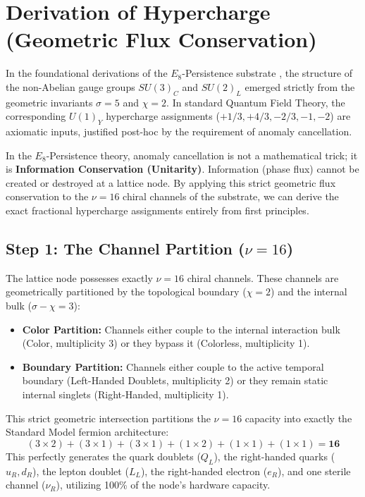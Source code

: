 \section{Derivation of Hypercharge (Geometric Flux Conservation)}
\label{app:OriginOfHypercharge}

In the foundational derivations of the $E_8$-Persistence substrate \cite{meyer_informational_2026}, the structure of the non-Abelian gauge groups $SU(3)_C$ and $SU(2)_L$ emerged strictly from the geometric invariants $\sigma=5$ and $\chi=2$. In standard Quantum Field Theory, the corresponding $U(1)_Y$ hypercharge assignments ($+1/3, +4/3, -2/3, -1, -2$) are axiomatic inputs, justified post-hoc by the requirement of anomaly cancellation.

In the $E_8$-Persistence theory, anomaly cancellation is not a mathematical trick; it is \textbf{Information Conservation (Unitarity)}. Information (phase flux) cannot be created or destroyed at a lattice node. By applying this strict geometric flux conservation to the $\nu=16$ chiral channels of the substrate, we can derive the exact fractional hypercharge assignments entirely from first principles.

\subsection{Step 1: The Channel Partition (\texorpdfstring{$\nu=16$}{nu=16})}
The lattice node possesses exactly $\nu=16$ chiral channels. These channels are geometrically partitioned by the topological boundary ($\chi=2$) and the internal bulk ($\sigma-\chi=3$):

\begin{itemize}
    \item \textbf{Color Partition:} Channels either couple to the internal interaction bulk (Color, multiplicity 3) or they bypass it (Colorless, multiplicity 1). 
    \item \textbf{Boundary Partition:} Channels either couple to the active temporal boundary (Left-Handed Doublets, multiplicity 2) or they remain static internal singlets (Right-Handed, multiplicity 1).
\end{itemize}
This strict geometric intersection partitions the $\nu=16$ capacity into exactly the Standard Model fermion architecture: 
\begin{equation}
(3 \times 2) + (3 \times 1) + (3 \times 1) + (1 \times 2) + (1 \times 1) + (1 \times 1) = \mathbf{16}
\end{equation}
This perfectly generates the quark doublets ($Q_L$), the right-handed quarks ($u_R, d_R$), the lepton doublet ($L_L$), the right-handed electron ($e_R$), and one sterile channel ($\nu_R$), utilizing 100\% of the node's hardware capacity.

